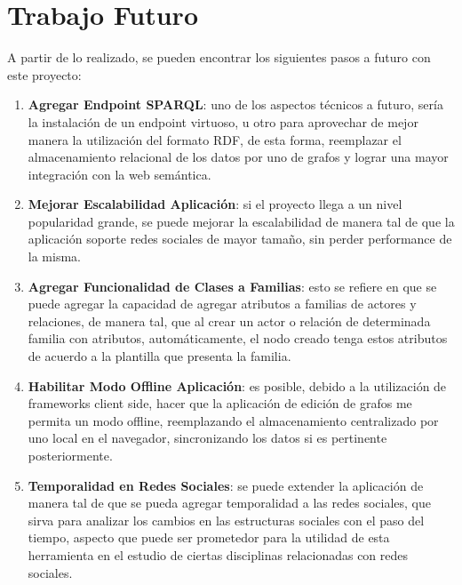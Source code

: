 


\section{Trabajo Futuro} %
\label{sec:trabajo_futuro}

A partir de lo realizado, se pueden encontrar los siguientes pasos a futuro con este proyecto:

  \begin{enumerate}
    \item \textbf{Agregar Endpoint SPARQL}: uno de los aspectos técnicos a futuro, sería la instalación de un endpoint virtuoso, u otro para aprovechar de mejor manera la utilización del formato RDF, de esta forma, reemplazar el almacenamiento relacional de los datos por uno de grafos y lograr una mayor integración con la web semántica.
    
    \item \textbf{Mejorar Escalabilidad Aplicación}: si el proyecto llega a un nivel popularidad grande, se puede mejorar la escalabilidad de manera tal de que la aplicación soporte redes sociales de mayor tamaño, sin perder performance de la misma.
    
    \item \textbf{Agregar Funcionalidad de Clases a Familias}: esto se refiere en que se puede agregar la capacidad de agregar atributos a familias de actores y relaciones, de manera tal, que al crear un actor o relación de determinada familia con atributos, automáticamente, el nodo creado tenga estos atributos de acuerdo a la plantilla que presenta la familia.
    
    \item \textbf{Habilitar Modo Offline Aplicación}: es posible, debido a la utilización de frameworks client side, hacer que la aplicación de edición de grafos me permita un modo offline, reemplazando el almacenamiento centralizado por uno local en el navegador, sincronizando los datos si es pertinente posteriormente.
    
    \item \textbf{Temporalidad en Redes Sociales}: se puede extender la aplicación de manera tal de que se pueda agregar temporalidad a las redes sociales, que sirva para analizar los cambios en las estructuras sociales con el paso del tiempo, aspecto que puede ser prometedor para la utilidad de esta herramienta en el estudio de ciertas disciplinas relacionadas con redes sociales.
    

\end{enumerate}
